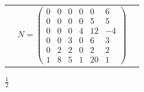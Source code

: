 \documentclass[a4paper,10pt]{article}
\newcommand{\df}{\frac}
\begin{document}
\begin{table}[h!]
\begin{tabular}{ c c c }
    &

    $ N= 
        \left( 
            \begin{matrix} 
                0 & 0 & 0 & 0 & 0 & 6 \\
                0 & 0 & 0 & 0 & 5 & 5 \\
                0 & 0 & 0 & 4 & 12 & -4 \\
                0 & 0 & 3 & 0 & 6 & 3 \\
                0 & 2 & 2 & 0 & 2 & 2 \\
                1 & 8 & 5 & 1 & 20 & 1 
            \end{matrix} 
        \right)
    $

    \\ [6ex] %

    \end{tabular}
\end{table}





$ \df {1} {2}$
\end{document}
